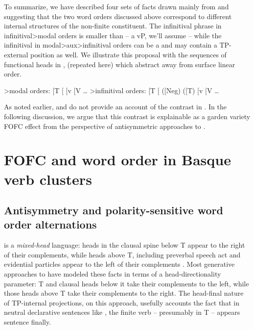 \documentclass[output=paper]{langscibook}
\begin{document}
To summarize, we have described four sets of facts drawn mainly from \citet{etxepare-uribeetxebarria2009, etxepare-uribeetxebarria2012} and \citet{balza2010} suggesting that the two word orders discussed above correspond to different internal structures of the non-finite constituent. The infinitival phrase in in\-fin\-i\-ti\-val>mo\-dal orders is smaller than  -- a vP, we'll assume -- while the infinitival in modal>aux>infinitival orders can be a  and may contain a TP-external  position as well.  We illustrate this proposal with the sequences of functional heads in \protect{}, (repeated here) which abstract away from surface linear order.
 
\ea	\protect\label{structuresensitivity} \ea {}>modal orders: [T [ [v [V \ldots  
 	                                     \ex {}>infinitival orders: [T [ ([Neg) ([T)  [v [V \ldots
\z\z										 

As noted earlier, \citet{balza2010} and \citet{etxepare-uribeetxebarria2009} do not provide an account of the contrast in .  In the following discussion, we argue that this contrast is explainable as a garden variety FOFC effect from the perspective of antisymmetric approaches to .

\section{FOFC and word order in Basque verb clusters}\label{sec:haddican:4}
\subsection{Antisymmetry and polarity-sensitive word order alternations}

 is a \textit{mixed-head} language: heads in the clausal spine below T appear to the right of their complements, while heads above T, including preverbal speech act and evidential particles appear to the left of their complements \citep{derijk1969, ortizdeurbina1989, ortizdeurbina1994, Laka1990,elordieta2001, irurtzun2007, elordieta2008}. Most generative approaches to  have modeled these facts in terms of a head-directionality parameter: T and clausal heads below it take their complements to the left, while those heads above T take their complements to the right. The head-final nature of TP-internal projections, on this approach, usefully accounts the fact that in neutral declarative sentences like \protect{}, the finite verb -- presumably in T -- appears sentence finally.
\end{document}
